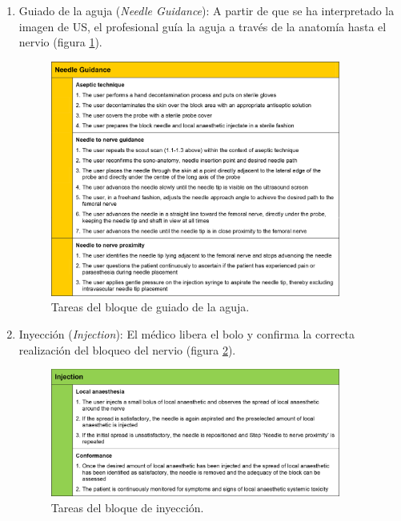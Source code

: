 \begin{enumerate}
\begin{figure}[th]
\end{figure}
    \item Guiado de la aguja (\emph{Needle Guidance}): A partir de que se ha interpretado la imagen de \ac{US}, el profesional guía la aguja a través de la anatomía hasta el nervio (figura \ref{fig:needleguidance}).  
    \begin{figure}[th]
   \centering
    \includegraphics[width=0.9\textwidth]{IMG/needleguidance.png}
    \caption{Tareas del bloque de guiado de la aguja. }
   \label{fig:needleguidance}
\end{figure}
    \item Inyección (\emph{Injection}): El médico libera el bolo y confirma la correcta realización del bloqueo del nervio (figura \ref{fig:injection}). 
    \begin{figure}[th]
   \centering
    \includegraphics[width=0.9\textwidth]{IMG/injection.png}
    \caption{ Tareas del bloque de inyección.}
   \label{fig:injection}
\end{figure}
\end{enumerate}

